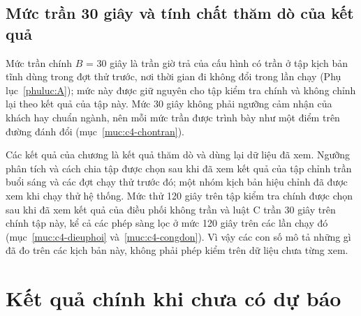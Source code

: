 
\subsection{Mức trần 30 giây và tính chất thăm dò của kết quả}
\label{muc:c4-thamdo}

Mức trần chính $B$ = 30 giây là trần giờ trả của cấu hình có trần ở tập kịch bản tĩnh dùng trong đợt thử trước,
nơi thời gian đi không đổi trong lần chạy (Phụ lục~\ref{phuluc:A}); mức này được giữ nguyên cho tập kiểm tra chính và
không chỉnh lại theo kết quả của tập này. Mức 30 giây không phải ngưỡng cảm nhận của khách hay chuẩn ngành, nên mỗi
mức trần được trình bày như một điểm trên đường đánh đổi (mục~\ref{muc:c4-chontran}).

Các kết quả của chương là kết quả thăm dò và dùng lại dữ liệu đã xem. Ngưỡng phân tích và cách chia tập được chọn
sau khi đã xem kết quả của tập chỉnh trần buổi sáng và các đợt chạy thử trước đó; một nhóm kịch bản hiệu chỉnh đã
được xem khi chạy thử hệ thống. Mức thử 120 giây trên tập kiểm tra chính được chọn sau khi đã xem kết quả của điều
phối không trần và luật C trần 30 giây trên chính tập này, kể cả các phép sàng lọc ở mức 120 giây trên các lần chạy
đó (mục~\ref{muc:c4-dieuphoi} và~\ref{muc:c4-congdon}). Vì vậy các con số mô tả những gì đã đo trên các kịch bản
này, không phải phép kiểm trên dữ liệu chưa từng xem.

\section{Kết quả chính khi chưa có dự báo}
\label{muc:c4-ketqua}

